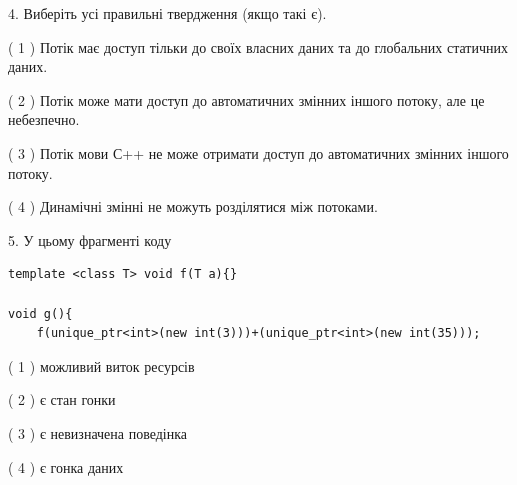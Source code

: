 \documentclass[12pt, ukrainian]{article}
\begin{document}
\begin {large}
{%
4. Виберіть усі правильні твердження (якщо такі є).\par
\vspace{2mm}

( 1 ) Потік має доступ тільки до своїх власних даних та до глобальних статичних даних.%

( 2 ) Потік може мати доступ до автоматичних змінних іншого потоку, але це небезпечно.%

( 3 ) Потік мови С++ не може отримати доступ до автоматичних змінних іншого потоку.%

( 4 ) Динамічні змінні не можуть розділятися між потоками.%


5. У цьому фрагменті коду
\begin{verbatim}
template <class T> void f(T a){}

void g(){
    f(unique_ptr<int>(new int(3)))+(unique_ptr<int>(new int(35)));
\end{verbatim}

( 1 ) можливий виток ресурсів%

( 2 ) є стан гонки%

( 3 ) є невизначена поведінка%

( 4 ) є гонка даних%
}
\end {large}
\end{document}
